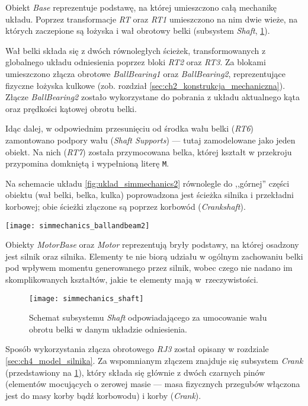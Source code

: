 Obiekt \textit{Base} reprezentuje podstawę, na której umieszczono całą mechanikę układu. Poprzez transformacje \textit{RT} oraz \textit{RT1} umieszczono na nim dwie wieże, na których zaczepione są łożyska i wał obrotowy belki (subsystem \textit{Shaft}, \cref{fig:sm_shaft}).

Wał belki składa się z dwóch równoległych ścieżek, transformowanych z globalnego układu odniesienia poprzez bloki \textit{RT2} oraz \textit{RT3}. Za blokami umieszczono złącza obrotowe \textit{BallBearing1} oraz \textit{BallBearing2}, reprezentujące fizyczne łożyska kulkowe (zob. rozdział \ref{sec:ch2_konstrukcja_mechaniczna}). Złącze \textit{BallBearing2} zostało wykorzystane do pobrania z układu aktualnego kąta oraz prędkości kątowej obrotu belki.

Idąc dalej, w odpowiednim przesunięciu od środka wału belki (\textit{RT6}) zamontowano podpory wału (\textit{Shaft Supports}) --- tutaj zamodelowane jako jeden obiekt. Na nich (\textit{RT7}) została przymocowana belka, której kształt w przekroju przypomina domkniętą i wypełnioną literę \texttt{M}.

Na schemacie układu \ref{fig:uklad_simmechanics2} równolegle do ,,górnej'' części obiektu (wał belki, belka, kulka) poprowadzona jest ścieżka silnika i przekładni korbowej; obie ścieżki złączone są poprzez korbowód (\textit{Crankshaft}).

\begin{sidewaysfigure}[p!]
    \centering
    \texttt{[image: simmechanics\_ballandbeam2]}
    \caption{Schemat \textsc{SimMechanics} układu kulki i belki.}
    \label{fig:uklad_simmechanics2}
\end{sidewaysfigure}

Obiekty \textit{MotorBase} oraz \textit{Motor} reprezentują bryły podstawy, na której osadzony jest silnik oraz silnika. Elementy te nie biorą udziału w ogólnym zachowaniu belki pod wpływem momentu generowanego przez silnik, wobec czego nie nadano im skomplikowanych kształtów, jakie te elementy mają w~rzeczywistości.

\begin{figure}[h]
    \centering
    \texttt{[image: simmechanics\_shaft]}
    \caption{Schemat subsystemu \textit{Shaft} odpowiadającego za umocowanie wału obrotu belki w danym układzie odniesienia.}
    \label{fig:sm_shaft}
\end{figure}

Sposób wykorzystania złącza obrotowego \textit{RJ3} został opisany w rozdziale \ref{sec:ch4_model_silnika}. Za wspomnianym złączem znajduje się subsystem \textit{Crank} (przedstawiony na \cref{fig:sm_shaft}), który składa się głównie z dwóch czarnych pinów (elementów mocujących o zerowej masie --- masa fizycznych przegubów włączona jest do masy korby bądź korbowodu) i korby (\textit{Crank}).


